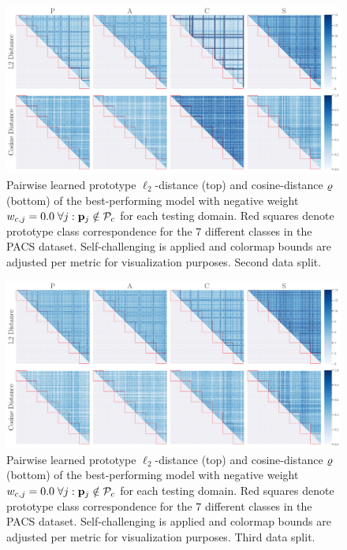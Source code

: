 \begin{figure}[ht]
    \centering
    \includegraphics[width=\textwidth]{Figures/Chapter4/2021-01-21-ProDropIncorrectWeight0.0WithSCdrop_f0.5SAVEResNet18oracle_validation_trial1.pdf}
    \caption[Second data split pairwise self-challenging prototype distances with $w_{c,j} = 0.0$] {Pairwise learned prototype $\ell_2$-distance (top) and cosine-distance $\varrho$ (bottom) of the best-performing model with negative weight $w_{c,j} = 0.0\; \forall j: \mathbf{p}_{j} \notin \mathcal{P}_c$ for each testing domain. Red squares denote prototype class correspondence for the $7$ different classes in the PACS dataset. Self-challenging is applied and colormap bounds are adjusted per metric for visualization purposes. Second data split.}
    \label{fig:pw_distance_0.0_trial1-sc}
\end{figure}

\begin{figure}[ht]
    \centering
    \includegraphics[width=\textwidth]{Figures/Chapter4/2021-01-21-ProDropIncorrectWeight0.0WithSCdrop_f0.5SAVEResNet18oracle_validation_trial2.pdf}
    \caption[Third data split pairwise self-challenging prototype distances with $w_{c,j} = 0.0$] {Pairwise learned prototype $\ell_2$-distance (top) and cosine-distance $\varrho$ (bottom) of the best-performing model with negative weight $w_{c,j} = 0.0\; \forall j: \mathbf{p}_{j} \notin \mathcal{P}_c$ for each testing domain. Red squares denote prototype class correspondence for the $7$ different classes in the PACS dataset. Self-challenging is applied and colormap bounds are adjusted per metric for visualization purposes. Third data split.}
    \label{fig:pw_distance_0.0_trial2-sc}
\end{figure}

